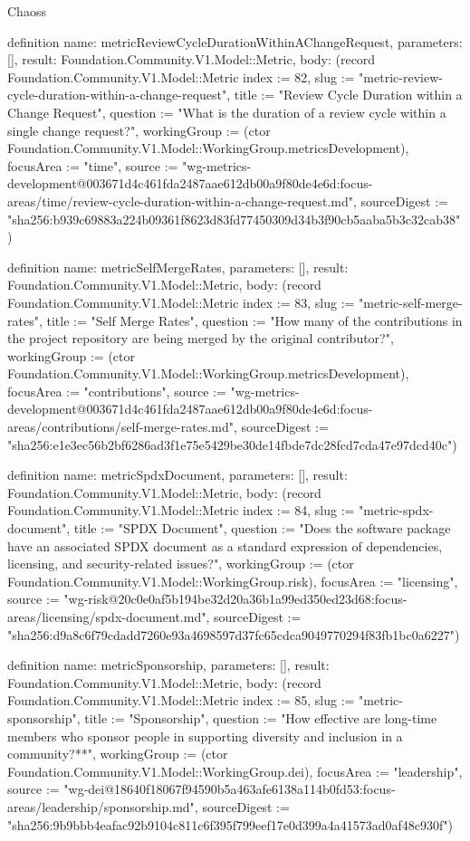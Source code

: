 \begin{lexlean}{Chaoss}
\begin{semanticmodule}
definition{
  name: metricReviewCycleDurationWithinAChangeRequest,
  parameters: [],
  result: Foundation.Community.V1.Model::Metric,
  body: (record Foundation.Community.V1.Model::Metric {index := 82, slug := "metric-review-cycle-duration-within-a-change-request", title := "Review Cycle Duration within a Change Request", question := "What is the duration of a review cycle within a single change request?", workingGroup := (ctor Foundation.Community.V1.Model::WorkingGroup.metricsDevelopment), focusArea := "time", source := "wg-metrics-development@003671d4c461fda2487aae612db00a9f80de4e6d:focus-areas/time/review-cycle-duration-within-a-change-request.md", sourceDigest := "sha256:b939c69883a224b09361f8623d83fd77450309d34b3f90cb5aaba5b3c32cab38"})
}

definition{
  name: metricSelfMergeRates,
  parameters: [],
  result: Foundation.Community.V1.Model::Metric,
  body: (record Foundation.Community.V1.Model::Metric {index := 83, slug := "metric-self-merge-rates", title := "Self Merge Rates", question := "How many of the contributions in the project repository are being merged by the original contributor?", workingGroup := (ctor Foundation.Community.V1.Model::WorkingGroup.metricsDevelopment), focusArea := "contributions", source := "wg-metrics-development@003671d4c461fda2487aae612db00a9f80de4e6d:focus-areas/contributions/self-merge-rates.md", sourceDigest := "sha256:e1e3ec56b2bf6286ad3f1e75e5429be30de14fbde7dc28fcd7cda47e97dcd40c"})
}

definition{
  name: metricSpdxDocument,
  parameters: [],
  result: Foundation.Community.V1.Model::Metric,
  body: (record Foundation.Community.V1.Model::Metric {index := 84, slug := "metric-spdx-document", title := "SPDX Document", question := "Does the software package have an associated SPDX document as a standard expression of dependencies, licensing, and security-related issues?", workingGroup := (ctor Foundation.Community.V1.Model::WorkingGroup.risk), focusArea := "licensing", source := "wg-risk@20c0e0af5b194be32d20a36b1a99ed350ed23d68:focus-areas/licensing/spdx-document.md", sourceDigest := "sha256:d9a8c6f79cdadd7260e93a4698597d37fc65cdca9049770294f83fb1bc0a6227"})
}

definition{
  name: metricSponsorship,
  parameters: [],
  result: Foundation.Community.V1.Model::Metric,
  body: (record Foundation.Community.V1.Model::Metric {index := 85, slug := "metric-sponsorship", title := "Sponsorship", question := "How effective are long-time members who sponsor people in supporting diversity and inclusion in a community?**", workingGroup := (ctor Foundation.Community.V1.Model::WorkingGroup.dei), focusArea := "leadership", source := "wg-dei@18640f18067f94590b5a463afe6138a114b0fd53:focus-areas/leadership/sponsorship.md", sourceDigest := "sha256:9b9bbb4eafac92b9104c811c6f395f799eef17e0d399a4a41573ad0af48c930f"})
}


\end{semanticmodule}
\end{lexlean}
